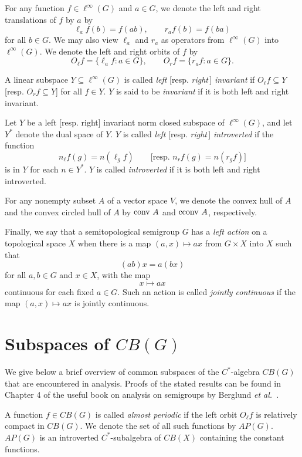 For any function $f\in \ell^\infty(G)$ and $a\in G$, we denote the left and right translations
of $f$ by $a$ by
\begin{equation}\label{translations}
\ell_a f(b) = f(ab), \qquad r_a f(b) = f(ba)
\end{equation}
for all $b\in G$.  We may also view $\ell_a$ and $r_a$ as operators from
$\ell^\infty(G)$ into $\ell^\infty(G)$.
We denote the left and right orbits of $f$ by
\[
O_\ell f = \{ \ell_a f: a\in G \},\qquad O_r f = \{ r_a f: a\in G \}.
\]

A linear subspace $Y \subseteq \ell^\infty(G)$ is called {\it left} [resp. {\it right}\,] {\it invariant} if
$O_\ell f \subseteq Y$ [resp. $O_r f \subseteq Y$] for all $f\in Y$.  $Y$ is said to be {\it invariant}
if it is both left and right invariant.

Let $Y$ be a left [resp. right] invariant norm closed subspace of $\ell^\infty(G)$,
and let $Y^*$ denote the dual space of $Y$.  $Y$ is called {\it left} [resp. {\it right}\,] {\it introverted}
if the function
\begin{equation}\label{introversions}
n_\ell f(g) = n(\ell_g f)\qquad \text{[resp. }n_r f(g) = n(r_g f)\text{]}
\end{equation}
is in $Y$ for each $n\in Y^*$.
$Y$ is called {\it introverted} if it is both left and right introverted.

For any nonempty subset $A$ of a vector space $V$, we denote the
convex hull of $A$ and the convex circled hull of $A$ by $\operatorname{conv\,} A$ and $\operatorname{cconv\,} A$, respectively.

Finally, we say that a semitopological semigroup $G$ has a {\it left action} on a topological
space $X$ when there is a map $(a,x) \mapsto ax$ from
$G \times X$ into $X$ such that
\[
(ab)x = a(bx)
\]
for all $a,b\in G$ and $x\in X$, with the map
\[
x\mapsto ax
\]
continuous for each fixed $a\in G$.  Such an action is called {\it jointly continuous}
if the map $(a,x) \mapsto ax$ is jointly continuous.

\section{Subspaces of $CB(G)$}
We give below a brief overview of common subspaces of the $C^*$-algebra $CB(G)$
that are encountered in analysis.  Proofs of the stated results
can be found in Chapter 4 of the useful book on analysis on semigroups
by Berglund {\it et al.}~\cite{milnes}.

A function $f\in CB(G)$ is called {\it almost periodic} if the left
orbit $O_\ell f$ is relatively compact in $CB(G)$.  We denote the set
of all such functions by $AP(G)$.  $AP(G)$ is an
introverted $C^*$-subalgebra of $CB(X)$ containing the constant functions.

